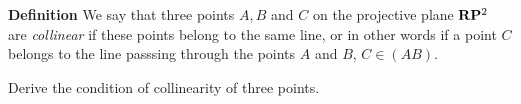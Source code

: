 \documentclass[12pt]{article}
\numberwithin{equation}{section}
\begin{document}

\begin{equation}\label{lineintheprojectiveplane}
\end{equation}

\m

{\bf Definition} We say that three points $A,B$
and $C$ on the projective plane ${\bf R}{\bf P}^2$ are {\it collinear}
if these points belong to the same line, 
or in other words if a point $C$ belongs to the
line passsing through the points $A$ and $B$, $C\in (AB)$.

\smallskip

Derive the condition of collinearity of three  points.



\end{document}
